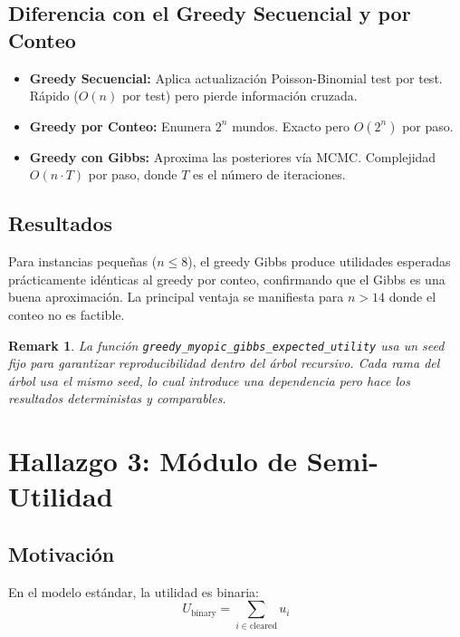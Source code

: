 \documentclass[11pt, a4paper]{article}
\newtheorem{remark}{Remark}
\begin{document}
\subsection{Diferencia con el Greedy Secuencial y por Conteo}
\begin{itemize}[nosep]
    \item \textbf{Greedy Secuencial:} Aplica actualizaci\'on
    Poisson-Binomial test por test. R\'apido ($O(n)$ por test) pero
    pierde informaci\'on cruzada.
    \item \textbf{Greedy por Conteo:} Enumera $2^n$ mundos. Exacto
    pero $O(2^n)$ por paso.
    \item \textbf{Greedy con Gibbs:} Aproxima las posteriores v\'ia MCMC.
    Complejidad $O(n \cdot T)$ por paso, donde $T$ es el n\'umero de
    iteraciones.
\end{itemize}

\subsection{Resultados}
Para instancias peque\~nas ($n \leq 8$), el greedy Gibbs produce utilidades
esperadas pr\'acticamente id\'enticas al greedy por conteo, confirmando
que el Gibbs es una buena aproximaci\'on. La principal ventaja se
manifiesta para $n > 14$ donde el conteo no es factible.

\begin{remark}
La funci\'on \texttt{greedy\_myopic\_gibbs\_expected\_utility} usa un
seed fijo para garantizar reproducibilidad dentro del \'arbol recursivo.
Cada rama del \'arbol usa el mismo seed, lo cual introduce una
dependencia pero hace los resultados deterministas y comparables.
\end{remark}

\section{Hallazgo 3: M\'odulo de Semi-Utilidad}
\label{sec:semi}

\subsection{Motivaci\'on}
En el modelo est\'andar, la utilidad es binaria:
\begin{equation}
    U_{\text{binary}} = \sum_{i \in \text{cleared}} u_i
\end{equation}
\end{document}
